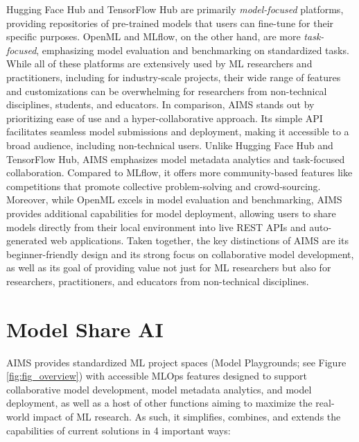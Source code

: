 Hugging Face Hub and TensorFlow Hub are primarily \textit{model-focused} platforms, providing repositories of pre-trained models that users can fine-tune for their specific purposes. OpenML and MLflow, on the other hand, are more \textit{task-focused}, emphasizing model evaluation and benchmarking on standardized tasks. While all of these platforms are extensively used by ML researchers and practitioners, including for industry-scale projects, their wide range of features and customizations can be overwhelming for researchers from non-technical disciplines, students, and educators. In comparison, AIMS stands out by prioritizing ease of use and a hyper-collaborative approach. Its simple API facilitates seamless model submissions and deployment, making it accessible to a broad audience, including non-technical users. Unlike Hugging Face Hub and TensorFlow Hub, AIMS emphasizes model metadata analytics and task-focused collaboration. Compared to MLflow, it offers more community-based features like competitions that promote collective problem-solving and crowd-sourcing. Moreover, while OpenML excels in model evaluation and benchmarking, AIMS provides additional capabilities for model deployment, allowing users to share models directly from their local environment into live REST APIs and auto-generated web applications. Taken together, the key distinctions of AIMS are its beginner-friendly design and its strong focus on collaborative model development, as well as its goal of providing value not just for ML researchers but also for researchers, practitioners, and educators from non-technical disciplines.

\section{Model Share AI}
AIMS provides standardized ML project spaces (Model Playgrounds; see Figure \ref{fig:fig_overview}) with accessible MLOps features designed to support collaborative model development, model metadata analytics, and model deployment, as well as a host of other functions aiming to maximize the real-world impact of ML research. As such, it simplifies, combines, and extends the capabilities of current solutions in 4 important ways:

